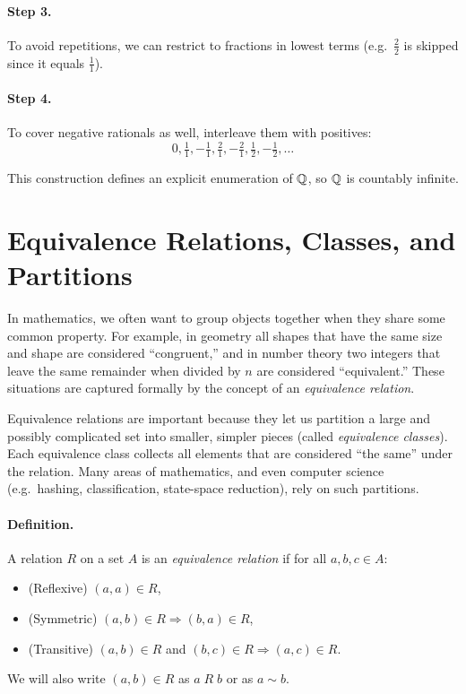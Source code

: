 \paragraph{Step 3.} To avoid repetitions, we can restrict to fractions in lowest terms
(e.g.\ $\tfrac{2}{2}$ is skipped since it equals $\tfrac{1}{1}$).

\paragraph{Step 4.} To cover negative rationals as well, interleave them with positives:
\[
0, \tfrac{1}{1}, -\tfrac{1}{1}, \tfrac{2}{1}, -\tfrac{2}{1}, \tfrac{1}{2}, -\tfrac{1}{2}, \dots
\]

This construction defines an explicit enumeration of $\mathbb{Q}$,
so $\mathbb{Q}$ is countably infinite.

\section{Equivalence Relations, Classes, and Partitions}

In mathematics, we often want to group objects together when they share some common property. 
For example,  in geometry all shapes that have the same size and shape are considered ``congruent,'' 
and in number theory two integers that leave the same remainder when divided by $n$ are considered ``equivalent.''  
These situations are captured formally by the concept of an \emph{equivalence relation}.  

Equivalence relations are important because they let us partition a large and possibly complicated set 
into smaller, simpler pieces (called \emph{equivalence classes}). Each equivalence class collects 
all elements that are considered ``the same'' under the relation. Many areas of mathematics, 
and even computer science (e.g.\ hashing, classification, state-space reduction), rely on such partitions.

\paragraph{Definition.} 
A relation $R$ on a set $A$ is an \emph{equivalence relation} if for all $a,b,c\in A$:
\begin{itemize}
  \item (Reflexive) $(a,a)\in R$,
  \item (Symmetric) $(a,b)\in R \Rightarrow (b,a)\in R$,
  \item (Transitive) $(a,b)\in R$ and $(b,c)\in R \Rightarrow (a,c)\in R$.
\end{itemize}
We will also write $(a,b) \in R$ as $a\; R \; b$ or as $a \sim b$. 

